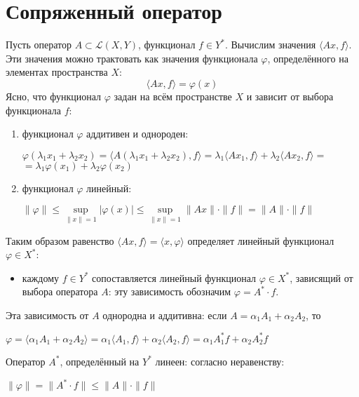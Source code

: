 \documentclass[12pt,a4paper,titlepage,oneside]{book}
\theoremstyle{definition}
\theoremstyle{plain}
\theoremstyle{remark}
\theoremstyle{remark}
\theoremstyle{remark}
\theoremstyle{remark}
\theoremstyle{plain}
\theoremstyle{plain}
\begin{document}
\section{Сопряженный оператор}
Пусть оператор $A \subset \mathcal{L}(X,Y)$, функционал $f \in Y^*$. Вычислим значения $ \langle Ax,f \rangle $. Эти значения можно трактовать как значения функционала $\varphi$, определённого на элементах пространства $X$:
\begin{equation}
 \langle Ax,f \rangle =\varphi(x)
\end{equation}
Ясно, что функционал $\varphi$ задан на всём пространстве $X$ и зависит от выбора функционала $f$:
\begin{enumerate}
\item функционал $\varphi$ аддитивен и однороден:
\begin{center}
$\varphi(\lambda_1x_1+\lambda_2x_2) = 
 \langle A(\lambda_1x_1+\lambda_2x_2),f \rangle  =
\lambda_1 \langle Ax_1,f \rangle  + \lambda_2 \langle Ax_2,f \rangle  =$\\$
= \lambda_1\varphi(x_1) + \lambda_2\varphi(x_2)$
\end{center}
\item функционал $\varphi$ линейный:
\begin{center}
$\lVert \varphi \lVert \leqslant \underset{\lVert x\lVert =1}{\sup} 
\vert \varphi(x) \vert \leqslant  \underset{\lVert x\lVert =1}{\sup} 
\lVert Ax \lVert \cdot \lVert f \lVert =
 \lVert A \lVert \cdot \lVert f \lVert $
\end{center}
\end{enumerate}
Таким образом равенство $ \langle Ax,f \rangle  =  \langle x,\varphi \rangle $ определяет линейный функционал $\varphi \in X^*$:
\begin{itemize}
\item каждому $f\in Y^*$ сопоставляется линейный функционал
 $\varphi\in X^*$, зависящий от выбора оператора $A$: эту зависимость обозначим $\varphi=A^*\cdot f$.
\end{itemize}
Эта зависимость от $A$ однородна и аддитивна:
если $A=\alpha_1A_1+\alpha_2A_2$, то 
\begin{center}
$\varphi= \langle \alpha_1A_1+\alpha_2A_2 \rangle  = \alpha_1 \langle A_1,f \rangle +\alpha_2 \langle A_2,f \rangle  =
\alpha_1A_1^*f+\alpha_2A_2^*f$
\end{center}
Оператор $A^*$, определённый на $Y^*$ линеен: согласно неравенству:
\begin{center}
$\lVert \varphi \lVert = \lVert A^* \cdot f \lVert \leqslant \lVert A \lVert \cdot \lVert f \lVert$
\end{center}
\end{document}
